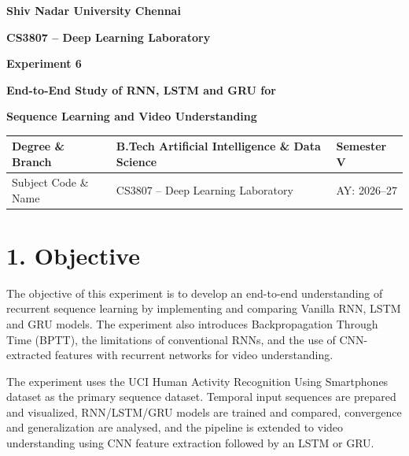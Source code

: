 \documentclass[10pt]{article}
\begin{document}

\begin{center}

{\large\textbf{Shiv Nadar University Chennai}}

\vspace{2mm}

{\normalsize\textbf{CS3807 -- Deep Learning Laboratory}}

\vspace{2mm}

{\large\textbf{Experiment 6}}

\vspace{1mm}

{\normalsize\textbf{End-to-End Study of RNN, LSTM and GRU for}}

{\normalsize\textbf{Sequence Learning and Video Understanding}}

\end{center}

\vspace{3mm}

\begin{tabular}{|p{3.4cm}|p{9.0cm}|p{1.4cm}|}
\hline
Degree \& Branch &
B.Tech Artificial Intelligence \& Data Science &
Semester V\\
\hline
Subject Code \& Name &
CS3807 -- Deep Learning Laboratory &
AY: 2026--27\\
\hline
\end{tabular}

\section*{1. Objective}

The objective of this experiment is to develop an end-to-end understanding of
recurrent sequence learning by implementing and comparing Vanilla RNN, LSTM
and GRU models. The experiment also introduces Backpropagation Through Time
(BPTT), the limitations of conventional RNNs, and the use of CNN-extracted
features with recurrent networks for video understanding.

The experiment uses the UCI Human Activity Recognition Using Smartphones
dataset as the primary sequence dataset. Temporal input sequences are prepared and visualized, RNN/LSTM/GRU models are trained and compared, convergence and generalization are analysed, and the pipeline is extended
to video understanding using CNN feature extraction followed by an LSTM or
GRU.
\end{document}
